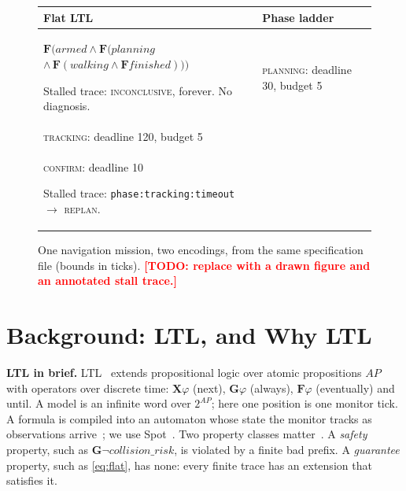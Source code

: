 \documentclass[letterpaper, 10pt, journal, twoside]{IEEEtran}
\newcommand{\TODO}[1]{\textcolor{red}{\textbf{[TODO: #1]}}}
\newcommand{\G}{\mathbf{G}}
\newcommand{\F}{\mathbf{F}}
\newcommand{\X}{\mathbf{X}}
\begin{document}
\begin{figure}[t]
\centering
\small
\begin{tabular}{@{}p{}p{}@{}}
\toprule
\textbf{Flat LTL} & \textbf{Phase ladder} \\
\midrule
$\F(\mathit{armed} \wedge \F(\mathit{planning}$
$\wedge\, \F(\mathit{walking} \wedge \F \mathit{finished})))$
\vspace{3pt}

Stalled trace: \textsc{inconclusive}, forever. No diagnosis.
&
\textsc{planning}: deadline 30, budget 5\\
\textsc{tracking}: deadline 120, budget 5\\
\textsc{confirm}: deadline 10
\vspace{3pt}

Stalled trace: \texttt{phase:tracking:timeout} $\rightarrow$
\textsc{replan}.
\\
\bottomrule
\end{tabular}
\caption{One navigation mission, two encodings, from the same
specification file (bounds in ticks). \TODO{replace with a drawn figure
and an annotated stall trace.}}
\label{fig:two}
\end{figure}

\section{Background: LTL, and Why LTL}
\label{sec:background}

\textbf{LTL in brief.} LTL~\cite{pnueli1977temporal} extends
propositional logic over atomic propositions $AP$ with operators over
discrete time: $\X\varphi$ (next), $\G\varphi$ (always), $\F\varphi$
(eventually) and until. A model is an infinite word over $2^{AP}$; here
one position is one monitor tick. A formula is compiled into an
automaton whose state the monitor tracks as observations
arrive~\cite{vardi1986automata}; we use Spot~\cite{duretlutz2016spot}.
Two property classes matter~\cite{manna1990hierarchy}. A \emph{safety}
property, such as $\G\neg\mathit{collision\_risk}$, is violated by a
finite bad prefix. A \emph{guarantee} property, such as
\eqref{eq:flat}, has none: every finite trace has an extension that
satisfies it.
\end{document}
